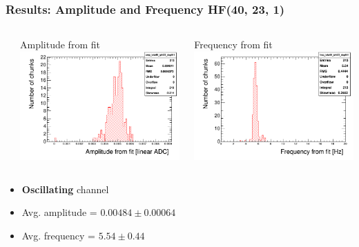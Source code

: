 \documentclass[bigger]{beamer}
\providecommand{\alert}[1]{\textbf{#1}}
\begin{document}
\begin{frame}
\frametitle{Results: Amplitude and Frequency HF(40, 23, 1)}
\label{sec-3-3-5}
\begin{columns} %
\label{sec-3-3-5-1}
\begin{column}{0.55\textwidth}
\label{sec-3-3-5-1-1}

\centering
Amplitude from fit
\includegraphics[width=.9\linewidth]{fig/amp_ieta40_iphi23_depth1.png}
\end{column}
\begin{column}{0.55\textwidth}
\label{sec-3-3-5-1-2}

\centering
Frequency from fit
\includegraphics[width=.9\linewidth]{fig/freq_ieta40_iphi23_depth1.png}
\end{column}
\end{columns}
\begin{itemize}

\item \alert{Oscillating} channel
\label{sec-3-3-5-2}%

\item Avg. amplitude = $0.00484 \pm 0.00064$
\label{sec-3-3-5-3}%

\item Avg. frequency = $5.54 \pm 0.44$
\label{sec-3-3-5-4}%
\end{itemize} %
\end{frame}
\end{document}
